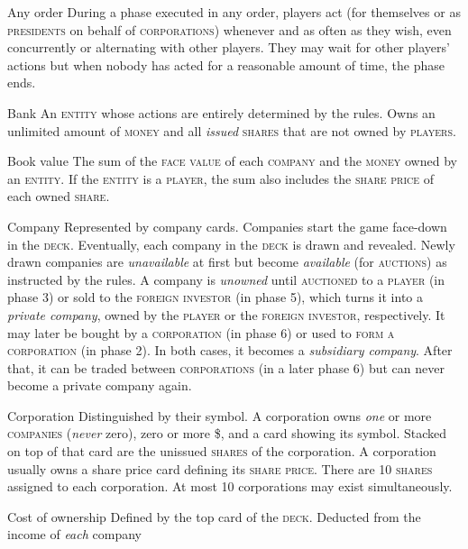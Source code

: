 \documentclass[8pt]{extarticle}
\newenvironment{my_description}
  {\begin{list}{}{\setlength{\labelwidth}{0pt}
   \leftmargin=1.2em
   \setlength{\itemindent}{-\leftmargin}
   \renewcommand{\makelabel}{\descriptionlabel}}
  \setlength{\itemsep}{1pt}
  \setlength{\parskip}{0pt}
  \setlength{\parsep}{0pt}
  }
  {\end{list}}
\begin{document}
\begin{small}
\begin{multicols}{2}
{\begin{my_description}
\item[Any order] During a phase executed in any order, players act (for
  themselves or as \textsc{presidents} on behalf of
  \textsc{corporations}) whenever and as often as they wish, even
  concurrently or alternating with other players. They may wait for
  other players' actions but when nobody has acted for a reasonable
  amount of time, the phase ends.
\item[Bank] An \textsc{entity} whose actions are entirely determined
  by the rules. Owns an unlimited amount of \textsc{money} and all
  \emph{issued} \textsc{shares} that are not owned by
  \textsc{players}.
\item[Book value] The sum of the \textsc{face value} of each
  \textsc{company} and the \textsc{money} owned by an
  \textsc{entity}. If the \textsc{entity} is a \textsc{player}, the
  sum also includes the \textsc{share price} of each owned
  \textsc{share}.
\item[Company] Represented by company cards. Companies start the game
  face-down in the \textsc{deck}. Eventually, each company in the
  \textsc{deck} is drawn and revealed. Newly drawn companies are
  \emph{unavailable} at first but become \emph{available} (for
  \textsc{auctions}) as instructed by the rules. A company is
  \emph{unowned} until \textsc{auctioned} to a \textsc{player} (in
  phase 3) or sold to the \textsc{foreign investor} (in phase 5),
  which turns it into a \emph{private company}, owned by the
  \textsc{player} or the \textsc{foreign investor}, respectively. It
  may later be bought by a \textsc{corporation} (in phase 6) or used
  to \textsc{form a corporation} (in phase 2). In both cases, it
  becomes a \emph{subsidiary company}. After that, it can be traded
  between \textsc{corporations} (in a later phase 6) but can never
  become a private company again.
\item[Corporation] Distinguished by their symbol. A corporation owns
  \emph{one} or more \textsc{companies} (\emph{never} zero), zero or
  more \$, and a card showing its symbol. Stacked on top of that card
  are the unissued \textsc{shares} of the corporation. A corporation
  usually owns a share price card defining its \textsc{share
    price}. There are 10 \textsc{shares} assigned to each
  corporation. At most 10 corporations may exist simultaneously.
\item[Cost of ownership] Defined by the top card of the
  \textsc{deck}. Deducted from the income of \emph{each} company

\end{my_description}}
\end{multicols}
\end{small}
\end{document}
